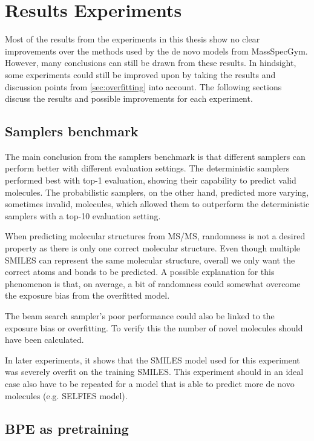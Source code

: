 \section{Results Experiments}

Most of the results from the experiments in this thesis show no clear improvements over the methods used by the de novo models from MassSpecGym.
However, many conclusions can still be drawn from these results.
In hindsight, some experiments could still be improved upon by taking the results and discussion points from \ref{sec:overfitting} into account.
The following sections discuss the results and possible improvements for each experiment.

\subsection{Samplers benchmark}

The main conclusion from the samplers benchmark is that different samplers can perform better with different evaluation settings.
The deterministic samplers performed best with top-1 evaluation, showing their capability to predict valid molecules.
The probabilistic samplers, on the other hand, predicted more varying, sometimes invalid, molecules, which allowed them to outperform the deterministic samplers with a top-10 evaluation setting.

When predicting molecular structures from \ac{MS/MS}, randomness is not a desired property as there is only one correct molecular structure.
Even though multiple SMILES can represent the same molecular structure, overall we only want the correct atoms and bonds to be predicted.
A possible explanation for this phenomenon is that, on average, a bit of randomness could somewhat overcome the exposure bias from the overfitted model.

The beam search sampler's poor performance could also be linked to the exposure bias or overfitting.
To verify this the number of novel molecules should have been calculated.

In later experiments, it shows that the SMILES model used for this experiment was severely overfit on the training SMILES.
This experiment should in an ideal case also have to be repeated for a model that is able to predict more de novo molecules (e.g. SELFIES model).

\subsection{\ac{BPE} as pretraining}

